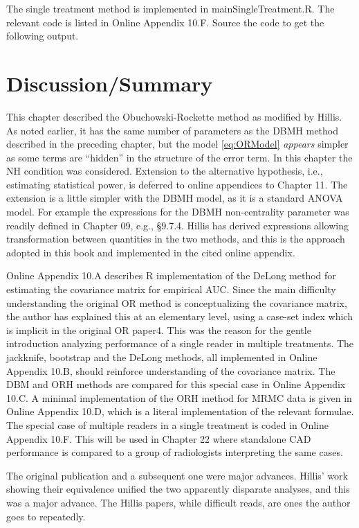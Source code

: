 \documentclass[
]{book}
\begin{document}
The single treatment method is implemented in mainSingleTreatment.R. The relevant code is listed in Online Appendix 10.F. Source the code to get the following output.

\hypertarget{discussionsummary}{%
\section{Discussion/Summary}\label{discussionsummary}}

This chapter described the Obuchowski-Rockette method as modified by Hillis. As noted earlier, it has the same number of parameters as the DBMH method described in the preceding chapter, but the model \eqref{eq:ORModel} \emph{appears} simpler as some terms are ``hidden'' in the structure of the error term. In this chapter the NH condition was considered. Extension to the alternative hypothesis, i.e., estimating statistical power, is deferred to online appendices to Chapter 11. The extension is a little simpler with the DBMH model, as it is a standard ANOVA model. For example the expressions for the DBMH non-centrality parameter was readily defined in Chapter 09, e.g., §9.7.4. Hillis has derived expressions allowing transformation between quantities in the two methods, and this is the approach adopted in this book and implemented in the cited online appendix.

Online Appendix 10.A describes R implementation of the DeLong method for estimating the covariance matrix for empirical AUC. Since the main difficulty understanding the original OR method is conceptualizing the covariance matrix, the author has explained this at an elementary level, using a case-set index which is implicit in the original OR paper4. This was the reason for the gentle introduction analyzing performance of a single reader in multiple treatments. The jackknife, bootstrap and the DeLong methods, all implemented in Online Appendix 10.B, should reinforce understanding of the covariance matrix. The DBM and ORH methods are compared for this special case in Online Appendix 10.C. A minimal implementation of the ORH method for MRMC data is given in Online Appendix 10.D, which is a literal implementation of the relevant formulae. The special case of multiple readers in a single treatment is coded in Online Appendix 10.F. This will be used in Chapter 22 where standalone CAD performance is compared to a group of radiologists interpreting the same cases.

The original publication \citep{RN204} and a subsequent one \citep{RN1450} were major advances. Hillis' work showing their equivalence unified the two apparently disparate analyses, and this was a major advance. The Hillis papers, while difficult reads, are ones the author goes to repeatedly.
\end{document}
